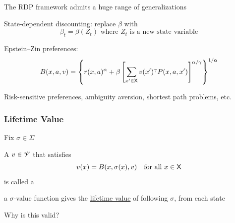 \begin{frame}
    
    The RDP framework admits a huge range of generalizations

              \vspace{0.5em}
              \vspace{0.5em}
    \Eg State-dependent discounting: replace $\beta$ with 
    \begin{equation*}
        \beta_t = \beta(Z_t)  \text{ where $Z_t$ is a new state variable}
    \end{equation*}

              \vspace{0.5em}
              \vspace{0.5em}
    \Eg Epstein--Zin preferences:
    \begin{equation*}
        B(x, a, v) =
        \left\{
            r(x, a)^\alpha + \beta 
                \left[
                    \sum_{x' \in \mathsf X} v(x')^\gamma P(x,a, x')
                \right]^{\alpha / \gamma}
        \right\}^{1/\alpha}
    \end{equation*}

              \vspace{0.5em}
    \Eg Risk-sensitive preferences, ambiguity aversion, shortest path problems, etc.
     
\end{frame}


\begin{frame}
    \frametitle{Lifetime Value}

    Fix $\sigma \in \Sigma$ 

              \vspace{0.5em}
              \vspace{0.5em}
    A $v \in \mathscr V$ that satisfies
    \begin{equation*}
        v(x) = B(x, \sigma(x), v)
        \quad \text{for all } x \in \mathsf X
    \end{equation*}
    is called a 

              \vspace{0.5em}
              \vspace{0.5em}
     a $\sigma$-value function gives the \underline{lifetime
    value} of following $\sigma$, from each state

              \vspace{0.5em}
              \vspace{0.5em}

    Why is this valid?

\end{frame}

